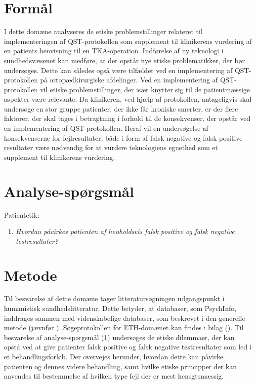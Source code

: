 \section{Formål}
I dette domæne analyseres de etiske problemstillinger relateret til implementeringen af QST-protokollen som supplement til klinikerens vurdering af en patients henvisning til en TKA-operation. Indførelse af ny teknologi i sundhedsvæsenet kan medføre, at der opstår nye etiske problematikker, der bør undersøges. Dette kan således også være tilfældet ved en implementering af QST-protokollen på ortopædkirurgiske afdelinger. Ved en implementering af QST-protokollen vil etiske problemstillinger, der især knytter sig til de patientmæssige aspekter være relevante. Da klinikeren, ved hjælp af protokollen, antageligvis skal undersøge en stor gruppe patienter, der ikke får kroniske smerter, er der flere faktorer, der skal tages i betragtning i forhold til de konsekvenser, der opstår ved en implementering af QST-protokollen. Heraf vil en undersøgelse af konsekvenserne for fejlresultater, både i form af falsk negative og falsk positive resultater være nødvendig for at vurdere teknologiens egnethed som et supplement til klinikerens vurdering.

\section{Analyse-spørgsmål}
Patientetik:
\begin{enumerate}
\item \textit{Hvordan påvirkes patienten af henholdsvis falsk positive og falsk negative testresultater?} %
\end{enumerate}

\section{Metode}
Til besvarelse af dette domæne tager litteratursøgningen udgangspunkt i humanistisk sundhedslitteratur. Dette betyder, at databaser, som PsychInfo, inddrages sammen med videnskabelige databaser, som beskrevet i den generelle metode (jævnfør ). Søgeprotokollen for ETH-domænet kan findes i bilag ().
Til besvarelse af analyse-spørgsmål (1) undersøges de etiske dilemmaer, der kan opstå ved at give patienter falsk positive og falsk negative testresultater som led i et behandlingsforløb. Der overvejes herunder, hvordan dette kan påvirke patienten og dennes videre behandling, samt hvilke etiske principper der kan anvendes til bestemmelse af hvilken type fejl der er mest hensgtsmæssig.

